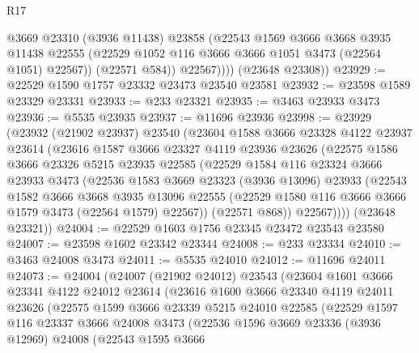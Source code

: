 \begin{lexlean}{R17}
\begin{coremodule}
                @3669
                @23310
                (@3936 @11438)
                @23858
                (@22543
                  @1569
                  @3666
                  @3668
                  @3935
                  @11438
                  @22555
                  (@22529 @1052 @116 @3666 @3666 @1051 @3473 (@22564 @1051) @22567))
                (@22571 @584))
              @22567))))
      (@23648 @23308))
@23929 := @22529 @1590 @1757 @23332 @23473 @23540 @23581
@23932 := @23598 @1589 @23329 @23331
@23933 := @233 @23321
@23935 := @3463 @23933 @3473
@23936 := @5535 @23935
@23937 := @11696 @23936
@23998 := @23929
    (@23932
      (@21902 @23937)
      @23540
      (@23604
        @1588
        @3666
        @23328
        @4122
        @23937
        @23614
        (@23616
          @1587
          @3666
          @23327
          @4119
          @23936
          @23626
          (@22575
            @1586
            @3666
            @23326
            @5215
            @23935
            @22585
            (@22529
              @1584
              @116
              @23324
              @3666
              @23933
              @3473
              (@22536
                @1583
                @3669
                @23323
                (@3936 @13096)
                @23933
                (@22543
                  @1582
                  @3666
                  @3668
                  @3935
                  @13096
                  @22555
                  (@22529 @1580 @116 @3666 @3666 @1579 @3473 (@22564 @1579) @22567))
                (@22571 @868))
              @22567))))
      (@23648 @23321))
@24004 := @22529 @1603 @1756 @23345 @23472 @23543 @23580
@24007 := @23598 @1602 @23342 @23344
@24008 := @233 @23334
@24010 := @3463 @24008 @3473
@24011 := @5535 @24010
@24012 := @11696 @24011
@24073 := @24004
    (@24007
      (@21902 @24012)
      @23543
      (@23604
        @1601
        @3666
        @23341
        @4122
        @24012
        @23614
        (@23616
          @1600
          @3666
          @23340
          @4119
          @24011
          @23626
          (@22575
            @1599
            @3666
            @23339
            @5215
            @24010
            @22585
            (@22529
              @1597
              @116
              @23337
              @3666
              @24008
              @3473
              (@22536
                @1596
                @3669
                @23336
                (@3936 @12969)
                @24008
                (@22543
                  @1595
                  @3666

\end{coremodule}
\end{lexlean}
